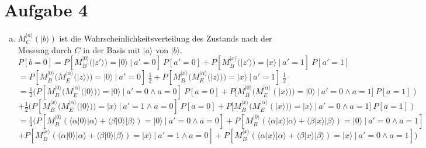 \documentclass[a4paper]{scrartcl}
\begin{document}
\newpage
\section*{Aufgabe 4}
\begin{enumerate}[a)]

\item $M_C^{|a\rangle}(|b\rangle)$ ist die Wahrscheinlichkeitsverteilung des Zustands nach der Messung durch $C$ in der Basis mit $|a\rangle$ von $|b\rangle$.\\

$P[b=0] = P[M_B^{|0\rangle}(|z'\rangle)=|0\rangle~|~a'=0]~P[a'=0] + P[M_B^{|x\rangle}(|z'\rangle)=|x\rangle~|~a'=1]~P[a'=1]$\\
$=P[M_B^{|0\rangle}(M_E^{|\alpha \rangle}(|z\rangle))=|0\rangle~|~a'=0]~\frac{1}{2} + P[M_B^{|x\rangle}(M_E^{|\alpha \rangle}(|z\rangle))=|x\rangle~|~a'=1]~\frac{1}{2}$\\
$=\frac{1}{2} (P[M_B^{|0\rangle}(M_E^{|\alpha \rangle}(|0\rangle))=|0\rangle~|~a'=0 \wedge a=0]~P[a=0] + P[M_B^{|0\rangle}(M_E^{|\alpha \rangle}(|x\rangle))=|0\rangle~|~a'=0 \wedge a=1]~P[a=1])$\\
$+\frac{1}{2} (P[M_B^{|x\rangle}(M_E^{|\alpha \rangle}(|0\rangle))=|x\rangle~|~a'=1 \wedge a=0]~P[a=0] + P[M_B^{|x\rangle}(M_E^{|\alpha \rangle}(|x\rangle))=|x\rangle~|~a'=0 \wedge a=1]~P[a=1])$\\
$=\frac{1}{4} (P[M_B^{|0\rangle}(\langle \alpha|0\rangle |\alpha\rangle + \langle \beta|0\rangle |\beta\rangle)=|0\rangle~|~a'=0 \wedge a=0] + P[M_B^{|0\rangle}(\langle \alpha|x\rangle |\alpha\rangle + \langle \beta|x\rangle |\beta\rangle)=|0\rangle~|~a'=0 \wedge a=1]$\\
$+ P[M_B^{|x\rangle}(\langle \alpha|0\rangle |\alpha\rangle + \langle \beta|0\rangle |\beta\rangle)=|x\rangle~|~a'=1 \wedge a=0] + P[M_B^{|x\rangle}(\langle \alpha|x\rangle |\alpha\rangle + \langle \beta|x\rangle |\beta\rangle)=|x\rangle~|~a'=0 \wedge a=1])$\\
\end{enumerate}
\end{document}
